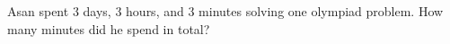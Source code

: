 Asan spent $3$ days, $3$ hours, and $3$ minutes solving one olympiad problem. How many minutes did he spend in total?
